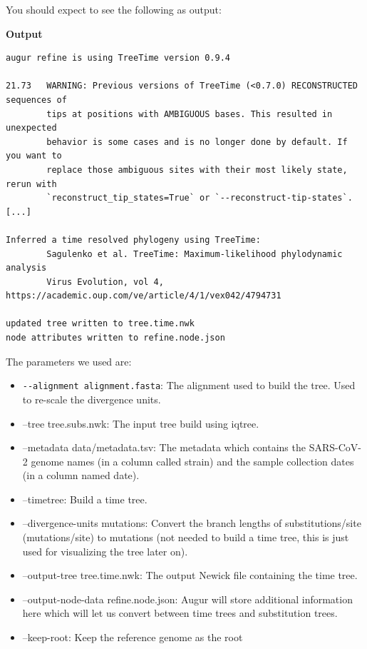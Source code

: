 \documentclass[
]{book}
\providecommand{\tightlist}{%
  \setlength{\itemsep}{0pt}\setlength{\parskip}{0pt}}
\begin{document}
You should expect to see the following as output:

\textbf{Output}

\begin{verbatim}
augur refine is using TreeTime version 0.9.4

21.73   WARNING: Previous versions of TreeTime (<0.7.0) RECONSTRUCTED sequences of
        tips at positions with AMBIGUOUS bases. This resulted in unexpected
        behavior is some cases and is no longer done by default. If you want to
        replace those ambiguous sites with their most likely state, rerun with
        `reconstruct_tip_states=True` or `--reconstruct-tip-states`.
[...]

Inferred a time resolved phylogeny using TreeTime:
        Sagulenko et al. TreeTime: Maximum-likelihood phylodynamic analysis
        Virus Evolution, vol 4, https://academic.oup.com/ve/article/4/1/vex042/4794731

updated tree written to tree.time.nwk
node attributes written to refine.node.json
\end{verbatim}

The parameters we used are:

\begin{itemize}
\tightlist
\item
  \texttt{-\/-alignment\ alignment.fasta}: The alignment used to build the tree. Used to re-scale the divergence units.
\item
  --tree tree.subs.nwk: The input tree build using iqtree.
\item
  --metadata data/metadata.tsv: The metadata which contains the SARS-CoV-2 genome names (in a column called strain) and the sample collection dates (in a column named date).
\item
  --timetree: Build a time tree.
\item
  --divergence-units mutations: Convert the branch lengths of substitutions/site (mutations/site) to mutations (not needed to build a time tree, this is just used for visualizing the tree later on).
\item
  --output-tree tree.time.nwk: The output Newick file containing the time tree.
\item
  --output-node-data refine.node.json: Augur will store additional information here which will let us convert between time trees and substitution trees.
\item
  --keep-root: Keep the reference genome as the root
\end{itemize}
\end{document}
